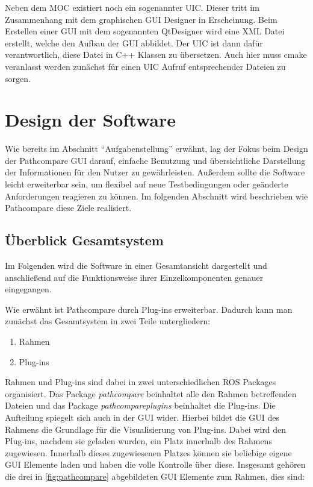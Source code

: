 Neben dem MOC existiert noch ein sogenannter \gls{UIC}. Dieser tritt im
Zusammenhang mit dem graphischen GUI Designer in Erscheinung. 
Beim Erstellen einer GUI mit dem sogenannten
QtDesigner wird eine XML Datei erstellt, welche den Aufbau der GUI abbildet.
Der UIC ist dann dafür verantwortlich, diese Datei in C++ Klassen zu übersetzen.
Auch hier muss cmake veranlasst werden zunächst für einen UIC Aufruf
entsprechender Dateien zu sorgen.


\section{Design der Software}
Wie bereits im Abschnitt ``Aufgabenstellung'' erwähnt, lag der Fokus beim
Design der Pathcompare GUI darauf, einfache Benutzung und übersichtliche
Darstellung der Informationen für den Nutzer zu gewährleisten.  Außerdem sollte
die Software leicht erweiterbar sein, um flexibel auf neue Testbedingungen oder
geänderte Anforderungen reagieren zu können. Im folgenden Abschnitt wird
beschrieben wie Pathcompare diese Ziele realisiert.

\subsection{Überblick Gesamtsystem}

Im Folgenden wird die Software in einer Gesamtansicht dargestellt und
anschließend auf die Funktionsweise ihrer Einzelkomponenten genauer eingegangen.

Wie erwähnt ist Pathcompare durch
Plug-ins erweiterbar. Dadurch kann man zunächst das Gesamtsystem in zwei Teile
untergliedern:

\begin{enumerate}
  \item Rahmen
  \item Plug-ins
\end{enumerate}

Rahmen und Plug-ins sind dabei in zwei unterschiedlichen ROS Packages
organisiert. Das Package \textit{pathcompare} beinhaltet alle den Rahmen betreffenden
Dateien und das Package \textit{pathcompareplugins} beinhaltet die Plug-ins.
Die Aufteilung spiegelt sich auch in der GUI wider.
Hierbei bildet die GUI des Rahmens die Grundlage für die Visualisierung von Plug-ins.
Dabei wird den Plug-ins, nachdem sie geladen wurden, ein Platz innerhalb des
Rahmens zugewiesen. Innerhalb dieses zugewiesenen Platzes können sie beliebige
eigene GUI Elemente laden und haben die volle Kontrolle über diese. Insgesamt
gehören die drei in \autoref{fig:pathcompare} abgebildeten GUI Elemente zum
Rahmen, dies sind:

